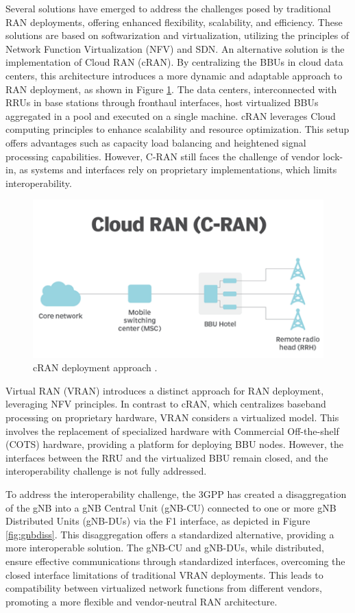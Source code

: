 Several solutions have emerged to address the challenges posed by traditional RAN deployments, offering enhanced flexibility, scalability, and efficiency. These solutions are based on softwarization and virtualization, utilizing the principles of Network Function Virtualization (NFV) and SDN. An alternative solution is the implementation of Cloud RAN (cRAN). By centralizing the BBUs in cloud data centers, this architecture introduces a more dynamic and adaptable approach to RAN deployment, as shown in Figure \ref{fig:cRAN}. The data centers, interconnected with RRUs in base stations through fronthaul interfaces, host virtualized BBUs aggregated in a pool and executed on a single machine. cRAN leverages Cloud computing principles to enhance scalability and resource optimization. This setup offers advantages such as capacity load balancing and heightened signal processing capabilities. However, C-RAN still faces the challenge of vendor lock-in, as systems and interfaces rely on proprietary implementations, which limits interoperability.

\begin{figure}[H]
    \centering
    \includegraphics[width=0.5\linewidth]{figures/cRAN.png}
    \caption[cRAN deployment approach]{cRAN deployment approach \cite{cRAN}.}
    \label{fig:cRAN}
\end{figure}

Virtual RAN (VRAN) introduces a distinct approach for RAN deployment, leveraging NFV principles. In contrast to cRAN, which centralizes baseband processing on proprietary hardware, VRAN considers a virtualized model. This involves the replacement of specialized hardware with Commercial Off-the-shelf (COTS) hardware, providing a platform for deploying BBU nodes. However, the interfaces between the RRU and the virtualized BBU remain closed, and the interoperability challenge is not fully addressed.


To address the interoperability challenge, the 3GPP has created a disaggregation of the gNB into a gNB Central Unit (gNB-CU) connected to one or more gNB Distributed Units (gNB-DUs) via the F1 interface, as depicted in Figure \ref{fig:gnbdiss}. This disaggregation offers a standardized alternative, providing a more interoperable solution. The gNB-CU and gNB-DUs, while distributed, ensure effective communications through standardized interfaces, overcoming the closed interface limitations of traditional VRAN deployments. This leads to compatibility between virtualized network functions from different vendors, promoting a more flexible and vendor-neutral RAN architecture.

